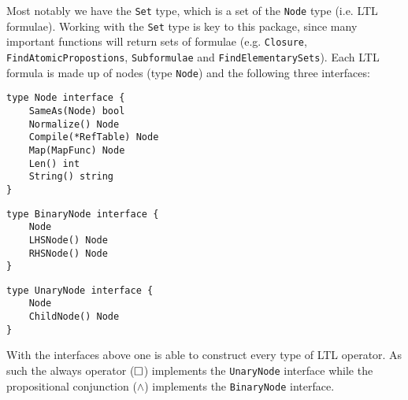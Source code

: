Most notably we have the \verb=Set= type, which is a set of the \verb=Node= type (i.e. LTL formulae). Working with the \verb=Set= type is key to this package, since many important functions will return sets of formulae (e.g. \verb=Closure=, \verb=FindAtomicPropostions=, \verb=Subformulae= and \verb=FindElementarySets=). Each LTL formula is made up of nodes (type \verb=Node=) and the following three interfaces:
\begin{lstlisting}[language=Golang, caption={Definition of \texttt{Node} interface}, floatplacement=H]
type Node interface {
	SameAs(Node) bool
	Normalize() Node
	Compile(*RefTable) Node
	Map(MapFunc) Node
	Len() int
	String() string
}
\end{lstlisting}

\begin{lstlisting}[language=Golang, caption={Definition of \texttt{BinaryNode} interface}, floatplacement=H]
type BinaryNode interface {
	Node
	LHSNode() Node
	RHSNode() Node
}
\end{lstlisting}

\begin{lstlisting}[language=Golang, caption={Definition of \texttt{UnaryNode} interface}, floatplacement=H]
type UnaryNode interface {
	Node
	ChildNode() Node
}
\end{lstlisting}
With the interfaces above one is able to construct every type of LTL operator. As such the always operator ($\square$) implements the \verb=UnaryNode= interface while the propositional conjunction ($\land$) implements the \verb=BinaryNode= interface.

